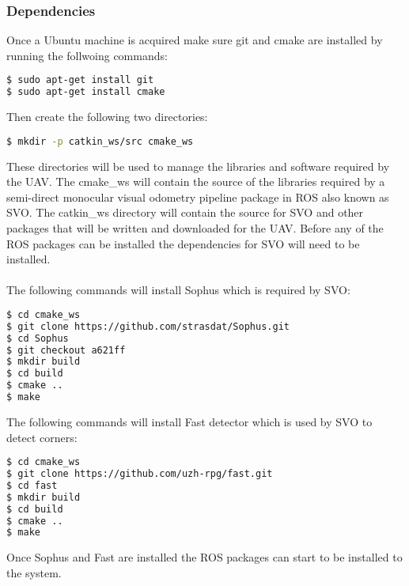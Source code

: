 \subsubsection{Dependencies}
Once a Ubuntu machine is acquired make sure git and cmake are installed by running the follwoing commands: 
\begin{lstlisting}[language=bash]
$ sudo apt-get install git
$ sudo apt-get install cmake
\end{lstlisting}
Then create the following two directories:
\begin{lstlisting}[language=bash]
$ mkdir -p catkin_ws/src cmake_ws
\end{lstlisting}
These directories will be used to manage the libraries and software required by the UAV. The cmake\_ws will contain the source of the libraries required by a semi-direct monocular visual odometry pipeline package in ROS also known as SVO. The catkin\_ws directory will contain the source for SVO and other packages that will be written and downloaded for the UAV. Before any of the ROS packages can be installed the dependencies for SVO will need to be installed. \\
\\
The following commands will install Sophus which is required by SVO:
\begin{lstlisting}[language=bash]
$ cd cmake_ws
$ git clone https://github.com/strasdat/Sophus.git
$ cd Sophus
$ git checkout a621ff
$ mkdir build
$ cd build
$ cmake ..
$ make
\end{lstlisting}
The following commands will install Fast detector which is used by SVO to detect corners:
\begin{lstlisting}[language=bash]
$ cd cmake_ws
$ git clone https://github.com/uzh-rpg/fast.git
$ cd fast
$ mkdir build
$ cd build
$ cmake ..
$ make
\end{lstlisting}
Once Sophus and Fast are installed the ROS packages can start to be installed to the system.
